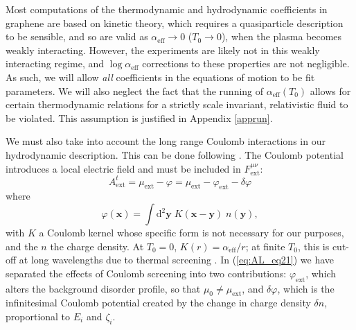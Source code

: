 Most computations of the thermodynamic and hydrodynamic coefficients in graphene are based on kinetic theory, which requires a quasiparticle description to be sensible, and so are valid as $\alpha_{\mathrm{eff}} \rightarrow 0$ ($T_0\rightarrow 0$), when the plasma becomes weakly interacting.   However, the experiments are likely not in this weakly interacting regime, and $\log \alpha_{\mathrm{eff}}$ corrections to these properties are not negligible.   As such, we will allow \emph{all} coefficients in the equations of motion to be fit parameters.    We will also neglect the fact that the running of $\alpha_{\mathrm{eff}}(T_0)$ allows for certain thermodynamic relations for a strictly scale invariant, relativistic fluid to be violated.   This assumption is justified in Appendix \ref{apprun}.

We must also take into account the long range Coulomb interactions in our hydrodynamic description.   This can be done following \cite{muller_collective_2008}.   The Coulomb potential introduces a local electric field and must be included in $F_{\mathrm{ext}}^{\mu\nu}$: \begin{equation}
A^t_{\mathrm{ext}} = \mu_{\mathrm{ext}}-\varphi = \mu_{\mathrm{ext}} - \varphi_{\mathrm{ext}} - \delta \varphi   \label{eq:AL_eq21}
\end{equation}
where \begin{equation}
\varphi(\mathbf{x}) = \int \mathrm{d}^2\mathbf{y}\; K(\mathbf{x}-\mathbf{y}) \; n(\mathbf{y}),
\end{equation}
with $K$ a Coulomb kernel whose specific form \cite{hwang_screening-induced_2009} is not necessary for our purposes, and the $n$ the charge density.    At $T_0=0$,   $K(r) = \alpha_{\mathrm{eff}}/r$;  at finite $T_0$, this is cut-off at long wavelengths due to thermal screening \cite{hwang_screening-induced_2009}.    In (\ref{eq:AL_eq21}) we have separated the effects of Coulomb screening into two contributions:  $\varphi_{\mathrm{ext}}$, which alters the background disorder profile, so that $\mu_0 \ne \mu_{\mathrm{ext}}$, and $\delta\varphi$, which is the infinitesimal Coulomb potential created by the change in charge density $\delta n$, proportional to $E_i$ and $\zeta_i$. 

